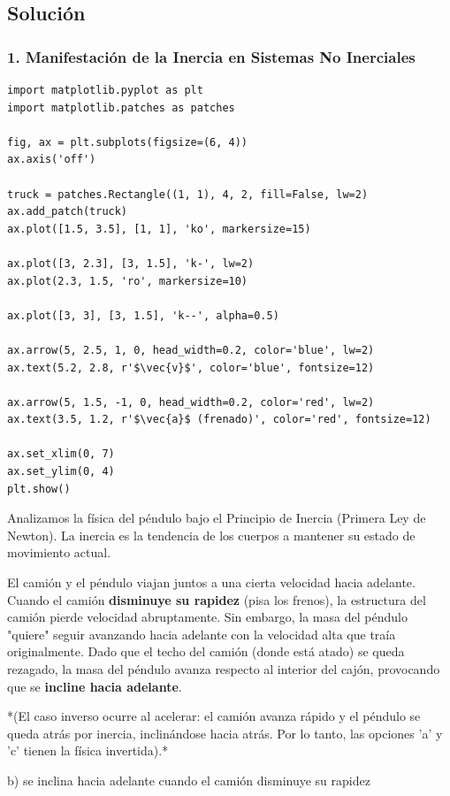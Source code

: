 \documentclass[12pt, a4paper]{article}
\begin{document}
\subsection*{Solución}

\subsubsection*{1. Manifestación de la Inercia en Sistemas No Inerciales}

\begin{verbatim}
import matplotlib.pyplot as plt
import matplotlib.patches as patches

fig, ax = plt.subplots(figsize=(6, 4))
ax.axis('off')

truck = patches.Rectangle((1, 1), 4, 2, fill=False, lw=2)
ax.add_patch(truck)
ax.plot([1.5, 3.5], [1, 1], 'ko', markersize=15)

ax.plot([3, 2.3], [3, 1.5], 'k-', lw=2)
ax.plot(2.3, 1.5, 'ro', markersize=10)

ax.plot([3, 3], [3, 1.5], 'k--', alpha=0.5)

ax.arrow(5, 2.5, 1, 0, head_width=0.2, color='blue', lw=2)
ax.text(5.2, 2.8, r'$\vec{v}$', color='blue', fontsize=12)

ax.arrow(5, 1.5, -1, 0, head_width=0.2, color='red', lw=2)
ax.text(3.5, 1.2, r'$\vec{a}$ (frenado)', color='red', fontsize=12)

ax.set_xlim(0, 7)
ax.set_ylim(0, 4)
plt.show()
\end{verbatim}

Analizamos la física del péndulo bajo el Principio de Inercia (Primera Ley de Newton). La inercia es la tendencia de los cuerpos a mantener su estado de movimiento actual.

El camión y el péndulo viajan juntos a una cierta velocidad hacia adelante. 
Cuando el camión \textbf{disminuye su rapidez} (pisa los frenos), la estructura del camión pierde velocidad abruptamente. Sin embargo, la masa del péndulo "quiere" seguir avanzando hacia adelante con la velocidad alta que traía originalmente. 
Dado que el techo del camión (donde está atado) se queda rezagado, la masa del péndulo avanza respecto al interior del cajón, provocando que se \textbf{incline hacia adelante}. 

*(El caso inverso ocurre al acelerar: el camión avanza rápido y el péndulo se queda atrás por inercia, inclinándose hacia atrás. Por lo tanto, las opciones 'a' y 'c' tienen la física invertida).*

\begin{tcolorbox}[colback=green!5!white, colframe=green!50!black, title=Respuesta Final]
\centering \Large b) se inclina hacia adelante cuando el camión disminuye su rapidez
\end{tcolorbox}
\end{document}
